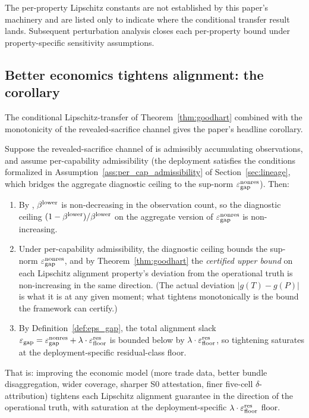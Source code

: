 The per-property Lipschitz constants are not established by this
paper's machinery and are listed only to indicate where the
conditional transfer result lands.  Subsequent perturbation
analysis closes each per-property bound under property-specific
sensitivity assumptions.

\subsection{Better economics tightens alignment: the corollary}
\label{sec:goodhart_corollary}

The conditional Lipschitz-transfer of Theorem~\ref{thm:goodhart}
combined with the monotonicity of the revealed-sacrifice channel
gives the paper's headline corollary.

\begin{corollary}
\label{cor:direction}
Suppose the revealed-sacrifice channel of
\citep[Revealed~Sacrifice]{lasser2026paper8a} is admissibly
accumulating observations, and assume per-capability
admissibility (the deployment satisfies the conditions formalized
in Assumption~\ref{ass:per_cap_admissibility} of
Section~\ref{sec:lineage}, which bridges the aggregate diagnostic
ceiling to the sup-norm $\varepsilon_{\mathrm{gap}}^{\mathrm{nonres}}$).  Then:
\begin{enumerate}
\item By
  \citep[Propositions~2~and~3]{lasser2026paper8a}, $\beta^{\mathrm{lower}}$ is
  non-decreasing in the observation count, so the
  diagnostic ceiling $(1 - \beta^{\mathrm{lower}})/\beta^{\mathrm{lower}}$ on the aggregate
  version of $\varepsilon_{\mathrm{gap}}^{\mathrm{nonres}}$ is non-increasing.
\item Under per-capability admissibility, the diagnostic
  ceiling bounds the sup-norm $\varepsilon_{\mathrm{gap}}^{\mathrm{nonres}}$, and by
  Theorem~\ref{thm:goodhart} the \emph{certified upper bound}
  on each Lipschitz alignment property's deviation from the
  operational truth is non-increasing in the same direction.
  (The actual deviation $|g(T) - g(P)|$ is what it is at any
  given moment; what tightens monotonically is the bound the
  framework can certify.)
\item By Definition~\ref{def:eps_gap}, the total alignment slack
  $\varepsilon_{\mathrm{gap}} = \varepsilon_{\mathrm{gap}}^{\mathrm{nonres}} + \lambda \cdot \varepsilon_{\mathrm{floor}}^{\mathrm{res}}$ is bounded
  below by $\lambda \cdot \varepsilon_{\mathrm{floor}}^{\mathrm{res}}$, so tightening saturates at
  the deployment-specific residual-class floor.
\end{enumerate}
That is: improving the economic model (more trade data, better
bundle disaggregation, wider coverage, sharper S0 attestation,
finer five-cell $\delta$-attribution) tightens each Lipschitz
alignment guarantee in the direction of the operational truth, with
saturation at the deployment-specific $\lambda \cdot \varepsilon_{\mathrm{floor}}^{\mathrm{res}}$
floor.
\end{corollary}

